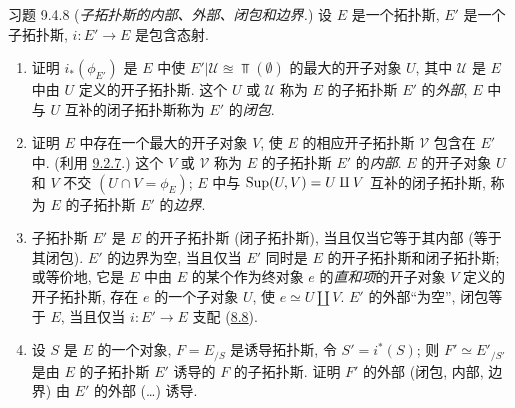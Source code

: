 \begin{enonce*}[remark]{习题 9.4.8}
(\emph{子拓扑斯的内部、外部、闭包和边界.})
设 $E$ 是一个拓扑斯, $E'$ 是一个子拓扑斯,
$i:E'\rightarrow E$ 是包含态射.
\begin{enumerate}
\renewcommand{\theenumi}{\alph{enumi}}
\renewcommand{\labelenumi}{\theenumi)}
\item 证明 $i_{\ast}(\phi_{E'})$ 是 $E$ 中使
$E'| \mathcal{U} \approxeq \Top(∅)$ 的最大的开子对象 $U$,
其中 $\mathcal{U}$ 是 $E$ 中由 $U$ 定义的开子拓扑斯.
这个 $U$ 或 $\mathcal{U}$ 称为 $E$ 的子拓扑斯 $E'$ 的\emph{外部},
$E$ 中与 $U$ 互补的闭子拓扑斯称为 $E'$ 的\emph{闭包}.

\item 证明 $E$ 中存在一个最大的开子对象 $V$,
使 $E$ 的相应开子拓扑斯 $\mathcal{V}$ 包含在 $E'$ 中.
(利用 \hyperref[IV.exer9.2.7]{9.2.7}.)
这个 $V$ 或 $\mathcal{V}$ 称为 $E$ 的子拓扑斯 $E'$ 的\emph{内部}.
$E$ 的开子对象 $U$ 和 $V$ 不交 $(U\cap V=\phi_E)$;
$E$ 中与 $\operatorname{Sup}(U,V)=U\amalg V$ 互补\pageoriginale 的闭子拓扑斯,
称为 $E$ 的子拓扑斯 $E'$ 的\emph{边界}.

\item 子拓扑斯 $E'$ 是 $E$ 的开子拓扑斯 (\resp 闭子拓扑斯),
当且仅当它等于其内部 (\resp 等于其闭包).
$E'$ 的边界为空,
当且仅当 $E'$ 同时是 $E$ 的开子拓扑斯和闭子拓扑斯;
或等价地, 它是 $E$ 中由 $E$ 的某个作为终对象 $e$ 的\emph{直和项}的开子对象 $V$
定义的开子拓扑斯,
\ie 存在 $e$ 的一个子对象 $U$, 使 $e\simeq U\amalg V$.
$E'$ 的外部“为空”, \ie 闭包等于 $E$,
当且仅当 $i:E'\rightarrow E$ 支配 (\hyperref[IV.exer8.8]{8.8}).

\item 设 $S$ 是 $E$ 的一个对象, $F=E_{/S}$ 是诱导拓扑斯,
令 $S'=i^{\ast}(S)$; 则 $F'\simeq E'_{/S'}$ 是由 $E$ 的子拓扑斯 $E'$ 诱导的 $F$ 的子拓扑斯.
证明 $F'$ 的外部 (\resp 闭包, \resp 内部, \resp 边界)
由 $E'$ 的外部 (\resp\ldots) 诱导.
\end{enumerate}
\end{enonce*}

